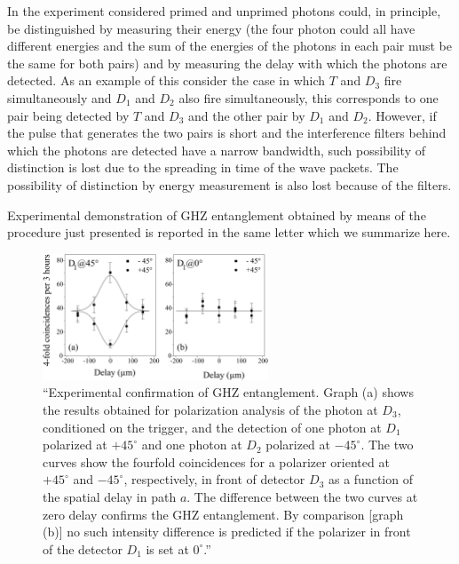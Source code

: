 In the experiment considered primed and unprimed photons could, in principle, be distinguished by measuring their energy (the four photon could all have different energies and the sum of the energies of the photons in each pair must be the same for both pairs) and by measuring the delay with which the photons are detected. As an example of this consider the case in which $T$ and $D_3$ fire simultaneously and $D_1$ and $D_2$ also fire simultaneously, this corresponds to one pair being detected by $T$ and $D_3$ and the other pair by $D_1$ and $D_2$. However, if the pulse that generates the two pairs is short and the interference filters behind which the photons are detected have a narrow bandwidth, such possibility of distinction is lost due to the spreading in time of the wave packets. The possibility of distinction by energy measurement is also lost because of the filters.

Experimental demonstration of GHZ entanglement obtained by means of the procedure just presented is reported in the same letter \cite{PhysRevLett.82.1345} which we summarize here.%

\begin{figure}
  \centering
  \includegraphics[width=0.6\textwidth]{Mainmatter/Chapter3/ghz-entanglement-exp-proof.png}
  \caption{``Experimental confirmation of GHZ entanglement. Graph (a) shows the results obtained for polarization analysis of the photon at $D_3$, conditioned on the trigger, and the detection of one photon at $D_1$ polarized at $+ 45^\circ$ and one photon at $D_2$ polarized at $- 45^\circ$. The two curves show the fourfold coincidences for a polarizer oriented at $+ 45^\circ$ and $- 45^\circ$, respectively, in front of detector $D_3$ as a function of the spatial delay in path $a$. The difference between the two curves at zero delay confirms the GHZ entanglement. By comparison [graph (b)] no such intensity difference is predicted if the polarizer in front of the detector $D_1$ is set at $0^\circ$.'' \cite{PhysRevLett.82.1345}}
  \label{fig:ghz-entanglement-exp-proof}
\end{figure}

